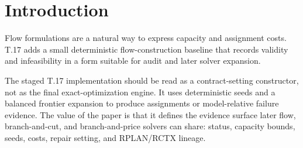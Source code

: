 \section{Introduction}

Flow formulations are a natural way to express capacity and assignment costs.
T.17 adds a small deterministic flow-construction baseline that records validity
and infeasibility in a form suitable for audit and later solver expansion.

The staged T.17 implementation should be read as a contract-setting constructor,
not as the final exact-optimization engine. It uses deterministic seeds and a
balanced frontier expansion to produce assignments or model-relative failure
evidence. The value of the paper is that it defines the evidence surface later
flow, branch-and-cut, and branch-and-price solvers can share: status, capacity
bounds, seeds, costs, repair setting, and RPLAN/RCTX lineage.
